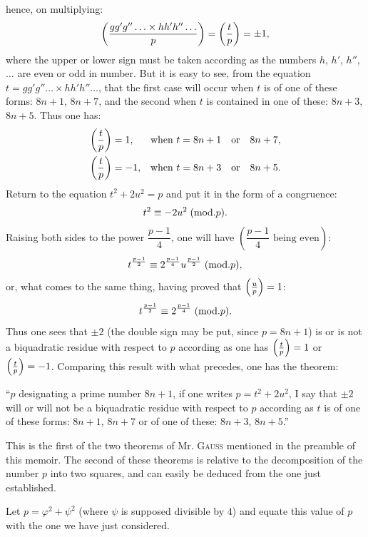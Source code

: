 \noindent
hence, on multiplying:
\[
\left(\frac{gg'g''\ldots\times hh'h''\ldots}{p}\right)=\left(\frac{t}{p}\right)=\pm1,
\]
where the upper or lower sign must be taken according as the numbers $h$,
$h'$, $h''$, $\ldots$ are even or odd in number. But it is easy to see, from the
equation $t=gg'g''\ldots\times hh'h''\ldots$, that the first case will occur when
$t$ is of one of these forms: $8n+1$, $8n+7$, and the second when $t$ is contained
in one of these: $8n+3$, $8n+5$. Thus one has:
\[
\begin{aligned}
\left(\frac{t}{p}\right)&=1, &&\text{when }t=8n+1\quad\text{or}\quad8n+7,\\
\left(\frac{t}{p}\right)&=-1, &&\text{when }t=8n+3\quad\text{or}\quad8n+5.
\end{aligned}
\]
Return to the equation $t^2+2u^2=p$ and put it in the form of a congruence:
\[
t^2\equiv-2u^2\;(\mathrm{mod}.p).
\]
Raising both sides to the power $\dfrac{p-1}{4}$, one will have $\left(\dfrac{p-1}{4}\text{ being even}\right)$:
\[
t^{\frac{p-1}{2}}\equiv2^{\frac{p-1}{4}}u^{\frac{p-1}{2}}\;(\mathrm{mod}.p),
\]
or, what comes to the same thing, having proved that $\left(\frac{u}{p}\right)=1$:
\[
t^{\frac{p-1}{2}}\equiv2^{\frac{p-1}{4}}\;(\mathrm{mod}.p).
\]
Thus one sees that $\pm2$ (the double sign may be put, since $p=8n+1$) is or is
not a biquadratic residue with respect to $p$ according as one has
$\left(\frac{t}{p}\right)=1$ or $\left(\frac{t}{p}\right)=-1$. Comparing this result with what precedes,
one has the theorem:
\par\indent
“$p$ designating a prime number $8n+1$, if one writes $p=t^2+2u^2$, I say that
$\pm2$ will or will not be a biquadratic residue with respect to $p$ according as
$t$ is of one of these forms: $8n+1$, $8n+7$ or of one of these: $8n+3$, $8n+5$.”
\par\indent
This is the first of the two theorems of Mr. \textsc{Gauss} mentioned in the
preamble of this memoir. The second of these theorems is relative to the
decomposition of the number $p$ into two squares, and can easily be deduced
from the one just established.
\par\indent
Let $p=\varphi^2+\psi^2$ (where $\psi$ is supposed divisible by $4$) and equate this
value of $p$ with the one we have just considered.
